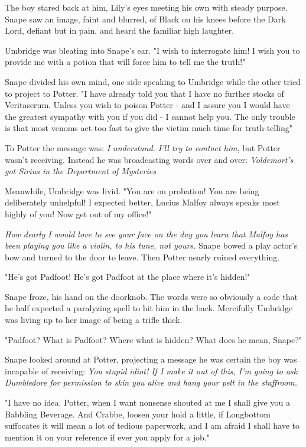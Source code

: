 The boy stared back at him, Lily's eyes meeting his own with steady purpose. Snape saw an image, faint and blurred, of Black on his knees before the Dark Lord, defiant but in pain, and heard the familiar high laughter.

Umbridge was bleating into Snape's ear. "I wish to interrogate him! I wish you to provide me with a potion that will force him to tell me the truth!"

Snape divided his own mind, one side speaking to Umbridge while the other tried to project to Potter. "I have already told you that I have no further stocks of Veritaserum. Unless you wish to poison Potter - and I assure you I would have the greatest sympathy with you if you did - I cannot help you. The only trouble is that most venoms act too fast to give the victim much time for truth-telling{\el}"

To Potter the message was: \emph{I understand. I'll try to contact him}, but Potter wasn't receiving. Instead he was broadcasting words over and over: \emph{Voldemort's got Sirius in the Department of Mysteries{\el}}

Meanwhile, Umbridge was livid. "You are on probation! You are being deliberately unhelpful! I expected better, Lucius Malfoy always speaks most highly of you! Now get out of my office!"

\emph{How dearly I would love to see your face on the day you learn that Malfoy has been playing you like a violin, to his tune, not yours.} Snape bowed a play actor's bow and turned to the door to leave. Then Potter nearly ruined everything.

"He's got Padfoot! He's got Padfoot at the place where it's hidden!"

Snape froze, his hand on the doorknob. The words were so obviously a code that he half expected a paralyzing spell to hit him in the back. Mercifully Umbridge was living up to her image of being a trifle thick.

"Padfoot? What is Padfoot? Where what is hidden? What does he mean, Snape?"

Snape looked around at Potter, projecting a message he was certain the boy was incapable of receiving: \emph{You stupid idiot! If I make it out of this, I'm going to ask Dumbledore for permission to skin you alive and hang your pelt in the staffroom.}

"I have no idea. Potter, when I want nonsense shouted at me I shall give you a Babbling Beverage. And Crabbe, loosen your hold a little, if Longbottom suffocates it will mean a lot of tedious paperwork, and I am afraid I shall have to mention it on your reference if ever you apply for a job."

